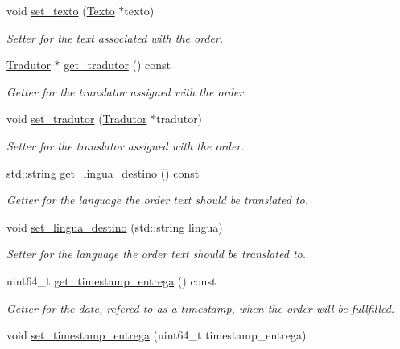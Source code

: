 \begin{DoxyCompactItemize}
void \hyperlink{class_encomenda_ab814e5f0fbbb1950393a376eb65f7c63}{set\-\_\-texto} (\hyperlink{class_texto}{Texto} $\ast$texto)
\begin{DoxyCompactList}\small\item\em Setter for the text associated with the order. \end{DoxyCompactList}\item 
\hyperlink{class_tradutor}{Tradutor} $\ast$ \hyperlink{class_encomenda_a50c1aefd950ca5852e93beec8882db70}{get\-\_\-tradutor} () const 
\begin{DoxyCompactList}\small\item\em Getter for the translator assigned with the order. \end{DoxyCompactList}\item 
void \hyperlink{class_encomenda_a05d46d1c4f6e83df419b2feb7cb9a082}{set\-\_\-tradutor} (\hyperlink{class_tradutor}{Tradutor} $\ast$tradutor)
\begin{DoxyCompactList}\small\item\em Setter for the translator assigned with the order. \end{DoxyCompactList}\item 
std\-::string \hyperlink{class_encomenda_a19dd853a12a54e97a7fe8b6332c5d4d3}{get\-\_\-lingua\-\_\-destino} () const 
\begin{DoxyCompactList}\small\item\em Getter for the language the order text should be translated to. \end{DoxyCompactList}\item 
void \hyperlink{class_encomenda_af8b12f8fba9c65a937f60ed81f9e0770}{set\-\_\-lingua\-\_\-destino} (std\-::string lingua)
\begin{DoxyCompactList}\small\item\em Setter for the language the order text should be translated to. \end{DoxyCompactList}\item 
uint64\-\_\-t \hyperlink{class_encomenda_a6c50e6398959da813ab57bc1f81fc760}{get\-\_\-timestamp\-\_\-entrega} () const 
\begin{DoxyCompactList}\small\item\em Getter for the date, refered to as a timestamp, when the order will be fullfilled. \end{DoxyCompactList}\item 
void \hyperlink{class_encomenda_a894c2ddbe25e0fa49f19fe35134ce3ba}{set\-\_\-timestamp\-\_\-entrega} (uint64\-\_\-t timestamp\-\_\-entrega)

\end{DoxyCompactItemize}
